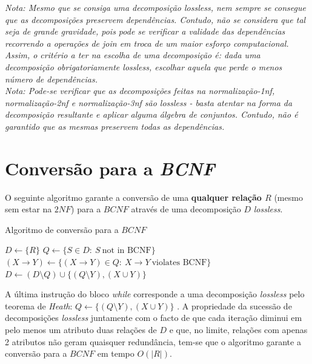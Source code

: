 \documentclass[oneside]{book}
\theoremstyle{definition}
\begin{document}
\textit{Nota: Mesmo que se consiga uma decomposição lossless, nem sempre se consegue que as decomposições preservem dependências. Contudo, não se considera que tal seja de grande gravidade, pois pode se verificar a validade das dependências recorrendo a operações de join em troca de um maior esforço computacional. Assim, o critério a ter na escolha de uma decomposição é: dada uma decomposição obrigatoriamente lossless, escolhar aquela que perde o menos número de dependências.} \\

\textit{Nota: Pode-se verificar que as decomposições feitas na normalização-1nf, normalização-2nf e normalização-3nf são lossless - basta atentar na forma da decomposição resultante e aplicar alguma álgebra de conjuntos. Contudo, não é garantido que as mesmas preservem todas as dependências.}

\section{Conversão para a \textit{BCNF}}

O seguinte algoritmo garante a conversão de uma \textbf{qualquer relação $R$} (mesmo sem estar na $2NF$) para a $BCNF$ através de uma decomposição $D$ \textit{lossless}.

\begin{algorithm}
    \caption{Algoritmo de conversão para a $BCNF$}\label{alg:cap}
    \begin{algorithmic}
    \State $D \gets \{R\}$
        \State $Q \gets \{S \in D : \: S \: \text{not in BCNF}\}$
        \State $(X \rightarrow Y) \gets \{(X \rightarrow Y) \in Q : \: X \rightarrow Y \: \text{violates BCNF}\}$
        \State $D \gets (D \setminus Q) \cup \{(Q \setminus Y), (X \cup Y)\}$
    \EndWhile
    \end{algorithmic}
 \end{algorithm}

 A última instrução do bloco \textit{while} corresponde a uma decomposição \textit{lossless} pelo teorema de \textit{Heath}: $Q \gets \{(Q \setminus Y), (X \cup Y)\}$ . A propriedade da sucessão de decomposições \textit{lossless} juntamente com o facto de que cada iteração diminui em pelo menos um atributo duas relações de $D$ e que, no limite, relações com apenas 2 atributos não geram quaisquer redundância, tem-se que o algoritmo garante a conversão para a $BCNF$ em tempo $O(|R|)$. \\
\end{document}
